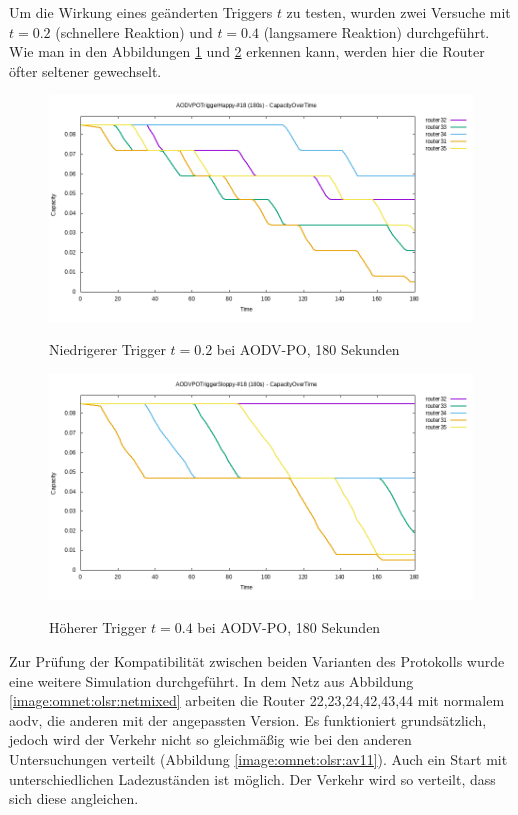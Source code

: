 Um die Wirkung eines geänderten Triggers $t$ zu testen, wurden zwei Versuche mit $t = 0.2$ (schnellere Reaktion) und $t=0.4$ (langsamere Reaktion) durchgeführt. Wie man in den Abbildungen \ref{image:omnet:olsr:av9} und \ref{image:omnet:olsr:av10} erkennen kann, werden hier die Router öfter \bzw seltener gewechselt.\newline

\begin{figure}
  \centering
  \includegraphics[scale=0.45]{bilder/av9.png} \\
  \caption{Niedrigerer Trigger $t=0.2$ bei AODV-PO, 180 Sekunden}
  \label{image:omnet:olsr:av9}
\end{figure}

\begin{figure}
  \centering
  \includegraphics[scale=0.45]{bilder/av10.png} \\
  \caption{Höherer Trigger $t=0.4$ bei AODV-PO, 180 Sekunden}
  \label{image:omnet:olsr:av10}
\end{figure}

Zur Prüfung der Kompatibilität zwischen beiden Varianten des Protokolls wurde eine weitere Simulation durchgeführt. In dem Netz aus Abbildung \ref{image:omnet:olsr:netmixed} arbeiten die Router 22,23,24,42,43,44 mit normalem \gls{aodv}, die anderen mit der angepassten Version. Es funktioniert grundsätzlich, jedoch wird der Verkehr nicht so gleichmäßig wie bei den anderen Untersuchungen verteilt (\vgl Abbildung \ref{image:omnet:olsr:av11}). Auch ein Start mit unterschiedlichen Ladezuständen ist möglich. Der Verkehr wird so verteilt, dass sich diese angleichen.\newline

